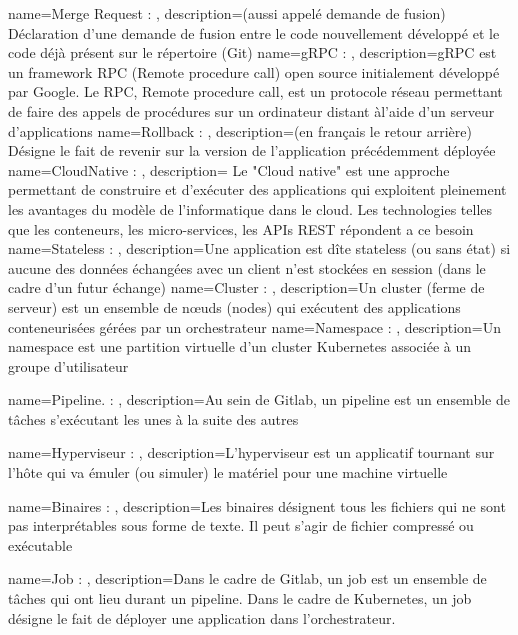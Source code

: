 {
    name=Merge Request : ,
    description={(aussi appelé demande de fusion) Déclaration d'une demande de fusion entre le code nouvellement développé et le code déjà présent sur le répertoire (Git)}
}
{
    name=gRPC : ,
    description={gRPC est un framework RPC (Remote procedure call) open source initialement développé par Google. Le RPC, Remote procedure call, est un protocole réseau permettant de faire des appels de procédures sur un ordinateur distant àl’aide d’un serveur d’applications}
}
{
    name=Rollback : ,
    description={(en français le retour arrière) Désigne le fait de revenir sur la version de l'application précédemment déployée}
}
{
    name=CloudNative : ,
    description={ Le "Cloud native" est une approche permettant de construire et d'exécuter des applications qui exploitent pleinement les avantages du modèle de l'informatique dans le cloud. Les technologies telles que les conteneurs, les micro-services, les APIs REST répondent a ce besoin}
}
{
    name=Stateless : ,
    description={Une application est dîte stateless (ou sans état) si aucune des données échangées avec un client n'est stockées en session (dans le cadre d'un futur échange)}
}
{
    name=Cluster : ,
    description={Un cluster  (ferme de serveur) est un ensemble de nœuds (nodes) qui exécutent des applications conteneurisées gérées par un orchestrateur}
}
{
    name=Namespace : ,
    description={Un namespace est une partition virtuelle d'un cluster Kubernetes associée à un groupe d'utilisateur}
}

{
    name=Pipeline. : ,
    description={Au sein de Gitlab, un pipeline est un ensemble de tâches s'exécutant les unes à la suite des autres}
}


{
    name=Hyperviseur : ,
    description={L’hyperviseur est un applicatif tournant sur l’hôte qui va émuler (ou simuler) le matériel pour une machine virtuelle}
}

{
    name=Binaires : ,
    description={Les binaires désignent tous les fichiers qui ne sont pas interprétables sous forme de texte. Il peut s'agir de fichier compressé ou exécutable}
}

{
    name=Job : ,
    description={Dans le cadre de Gitlab, un job est un ensemble de tâches qui ont lieu durant un pipeline. Dans le cadre de Kubernetes, un job désigne le fait de déployer une application dans l'orchestrateur.}
}

